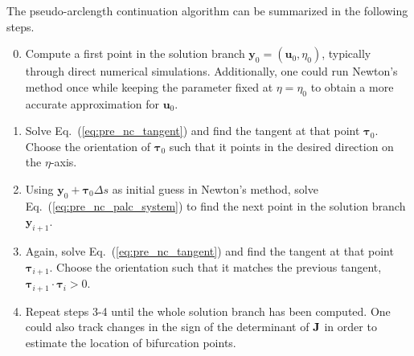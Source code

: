 The pseudo-arclength continuation algorithm can be summarized in the following steps.

\begin{enumerate}
    \setcounter{enumi}{-1}
    \item Compute a first point in the solution branch $\bm{y}_0 = (\bm{u}_0, \eta_0)$,
    typically through direct numerical simulations. Additionally, one could run
    Newton's method once while keeping the parameter fixed at $\eta = \eta_0$ to obtain
    a more accurate approximation for $\bm{u}_0$.

    \item Solve Eq.~(\ref{eq:pre_nc_tangent}) and find the tangent at that point $\bm{\tau}_0$.
    Choose the orientation of $\bm{\tau}_0$ such that it points in the desired direction on the
    $\eta$-axis.

    \item Using $\bm{y}_0 + \bm{\tau}_0 \Delta s$ as initial guess in Newton's method, solve
    Eq.~(\ref{eq:pre_nc_palc_system}) to find the next point in the solution branch $\bm{y}_{i+1}$.

    \item Again, solve Eq.~(\ref{eq:pre_nc_tangent}) and find the tangent at that point $\bm{\tau}_{i+1}$.
    Choose the orientation such that it matches the previous tangent, $\bm{\tau}_{i+1} \cdot \bm{\tau}_i > 0$.

    \item Repeat steps 3-4 until the whole solution branch has been computed. One could also
    track changes in the sign of the determinant of $\mathbf{J}$ in order to estimate the location
    of bifurcation points.
\end{enumerate}


